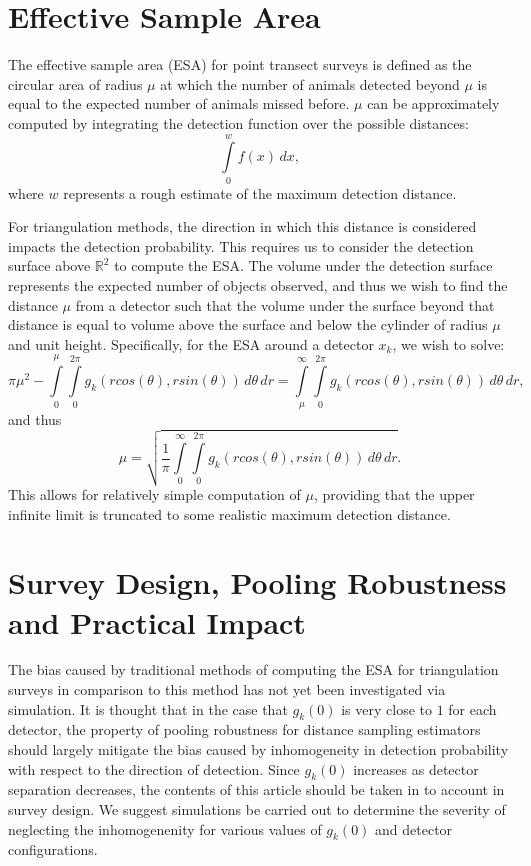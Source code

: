 \documentclass{lms}
\newcommand{\Int}{\int\limits}
\begin{document}
\section{Effective Sample Area}
The effective sample area (ESA) for point transect surveys is defined as the circular area of radius $\mu$ at which the number of animals detected beyond $\mu$ is equal to the expected number of animals missed before. $\mu$ can be approximately computed by integrating the detection function over the possible distances:
\begin{equation}
\Int_{0}^{w} f(x) \, dx,
\end{equation}
where $w$ represents a rough estimate of the maximum detection distance.

\vspace{0.1in}
For triangulation methods, the direction in which this distance is considered impacts the detection probability. This requires us to consider the detection surface above $\mathbb{R}^2$ to compute the ESA. The volume under the detection surface represents the expected number of objects observed, and thus we wish to find the distance $\mu$ from a detector such that the volume under the surface beyond that distance is equal to volume above the surface and below the cylinder of radius $\mu$ and unit height. Specifically, for the ESA around a detector $x_k$, we wish to solve:
\begin{equation}
\pi\mu^2 - \Int_{0}^{\mu} \Int_{0}^{2\pi} g_k(rcos(\theta), rsin(\theta)) \,d\theta\,dr = \Int_{\mu}^{\infty} \Int_{0}^{2\pi} g_k(rcos(\theta), rsin(\theta)) \,d\theta\,dr,
\end{equation}
and thus
\begin{equation}
\mu = \sqrt{\frac{1}{\pi}\Int_{0}^{\infty} \Int_{0}^{2\pi} g_k(rcos(\theta), rsin(\theta)) \,d\theta\,dr}.
\end{equation}
This allows for relatively simple computation of $\mu$, providing that the upper infinite limit is truncated to some realistic maximum detection distance. 

\section{Survey Design, Pooling Robustness and Practical Impact}
The bias caused by traditional methods of computing the ESA for triangulation surveys in comparison to this method has not yet been investigated via simulation. It is thought that in the case that $g_k(0)$ is very close to $1$ for each detector, the property of pooling robustness for distance sampling estimators should largely mitigate the bias caused by inhomogeneity in detection probability with respect to the direction of detection. Since $g_k(0)$ increases as detector separation decreases, the contents of this article should be taken in to account in survey design. We suggest simulations be carried out to determine the severity of neglecting the inhomogenenity for various values of $g_k(0)$ and detector configurations.
\end{document}
